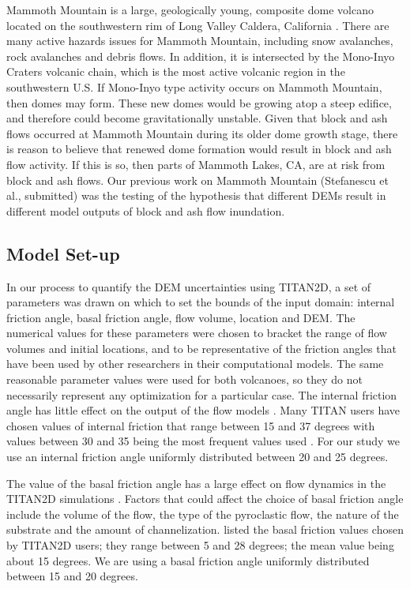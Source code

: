 \documentclass{article}
\begin{document}
Mammoth Mountain is a large, geologically young, composite dome
volcano located on the southwestern rim of Long Valley Caldera,
California \citep{Bailey1989}.  There are many active hazards issues
for Mammoth Mountain, including snow avalanches, rock avalanches and
debris flows. In addition, it is intersected by the Mono-Inyo Craters
volcanic chain, which is the most active volcanic region in the
southwestern U.S.  If Mono-Inyo type activity occurs on Mammoth
Mountain, then domes may form.  These new domes would be growing atop
a steep edifice, and therefore could become gravitationally unstable.
Given that block and ash flows occurred at Mammoth Mountain during its
older dome growth stage, there is reason to believe that renewed dome
formation would result in block and ash flow activity. If this is so,
then parts of Mammoth Lakes, CA, are at risk from block and ash flows.
Our previous work on Mammoth Mountain (Stefanescu et al., submitted)
was the testing of the hypothesis that different DEMs result in
different model outputs of block and ash flow inundation.

\subsection{Model Set-up}

In our process to quantify the DEM uncertainties using TITAN2D, a set
of parameters was drawn on which to set the bounds of the input
domain: internal friction angle, basal friction angle, flow volume,
location and DEM. The numerical values for these parameters were
chosen to bracket the range of flow volumes and initial locations, and
to be representative of the friction angles that have been used by
other researchers in their computational models.  The same reasonable
parameter values were used for both volcanoes, so they do not
necessarily represent any optimization for a particular case.  The
internal friction angle has little effect on the output of the flow
models \citep{Keith, sheridan_2005}. Many TITAN users have chosen
values of internal friction that range between 15 and 37 degrees with
values between 30 and 35 being the most frequent values used
\citep{Patra2005, murcia_2010}.  For our study we use an internal
friction angle uniformly distributed between 20 and 25 degrees.

The value of the basal friction angle has a large effect on flow
dynamics in the TITAN2D simulations \citep{Patra2005,
  stinton_2006}. Factors that could affect the choice of basal
friction angle include the volume of the flow, the type of the pyroclastic
flow, the nature of the substrate and the amount of
channelization. \citet{murcia_2010} listed the basal friction values
chosen by TITAN2D users; they range between 5 and 28 degrees; the mean
value being about 15 degrees. We are using a basal friction angle
uniformly distributed between 15 and 20 degrees.
 
\end{document}

